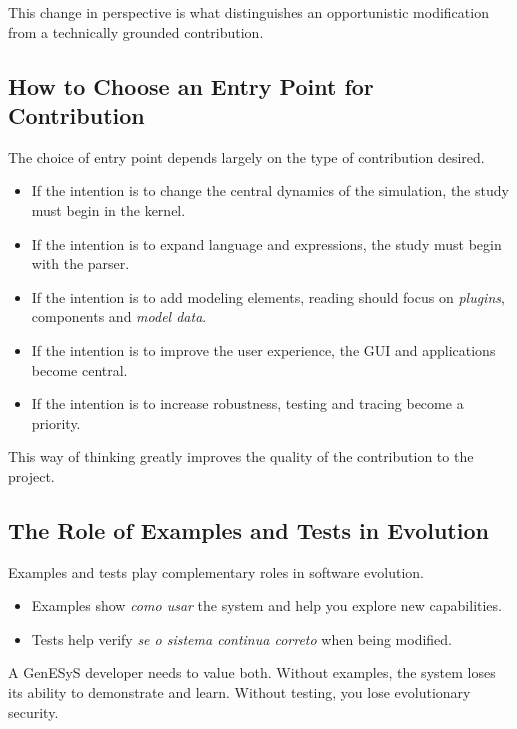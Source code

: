 This change in perspective is what distinguishes an opportunistic modification from a technically grounded contribution.

\subsection{How to Choose an Entry Point for Contribution}
\label{subsec:cap10_como_escolher_ponto_entrada}

The choice of entry point depends largely on the type of contribution desired.

\begin{itemize}
 \item If the intention is to change the central dynamics of the simulation, the study must begin in the kernel.
 \item If the intention is to expand language and expressions, the study must begin with the parser.
 \item If the intention is to add modeling elements, reading should focus on \textit{plugins}, components and \textit{model data}.
 \item If the intention is to improve the user experience, the GUI and applications become central.
 \item If the intention is to increase robustness, testing and tracing become a priority.
\end{itemize}

This way of thinking greatly improves the quality of the contribution to the project.

\subsection{The Role of Examples and Tests in Evolution}
\label{subsec:cap10_papel_exemplos_testes_evolucao}

Examples and tests play complementary roles in software evolution.

\begin{itemize}
 \item Examples show \emph{como usar} the system and help you explore new capabilities.
 \item Tests help verify \emph{se o sistema continua correto} when being modified.
\end{itemize}

A GenESyS developer needs to value both. Without examples, the system loses its ability to demonstrate and learn. Without testing, you lose evolutionary security.


